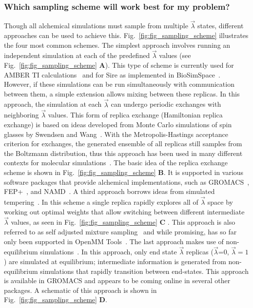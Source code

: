 \documentclass[9pt,bestpractices]{livecoms}
\begin{document}
\subsubsection{Which sampling scheme will work best for my problem?}
\label{sec:sampling_schemes}
Though all alchemical simulations must sample from multiple $\vec{\lambda}$ states, different approaches can be used to achieve this. Fig.~\ref{fig:fig_sampling_scheme} illustrates the four most common schemes. The simplest approach involves running an independent simulation at each of the predefined $\vec{\lambda}$ values (see Fig.~\ref{fig:fig_sampling_scheme} \textbf{A}). This type of scheme is currently used for AMBER TI calculations~\cite{song2019using} and for Sire as implemented in BioSimSpace~\cite{hedges2019biosimspace}. However, if these simulations can be run simultaneously with communication between them, a simple extension allows mixing between these replicas. In this approach, the simulation at each $\vec{\lambda}$ can undergo periodic exchanges with neighboring $\vec{\lambda}$ values. This form of replica exchange (Hamiltonian replica exchange) is based on ideas developed from Monte Carlo simulations of spin glasses by Swendsen and Wang~\cite{swendsen1986replica}. With the Metropolis-Hastings acceptance criterion for exchanges, the generated ensemble of all replicas still samples from the Boltzmann distribution, thus this approach has been used in many different contexts for molecular simulations~\cite{sugita2000multidimensionala,sugita1999replicaexchangea, woods2003developmenta, jiang2010free}. The basic idea of the replica exchange scheme is shown in Fig.~\ref{fig:fig_sampling_scheme} \textbf{B}. It is supported in various software packages that provide alchemical implementations, such as GROMACS~\cite{aldeghi2015accurate}, FEP+~\cite{wang2015accurate}, and NAMD~\cite{jiang2019computing}. A third approach borrows ideas from simulated tempering~\cite{marinari1992simulateda}. In this scheme a single replica rapidly explores all of $\vec{\lambda}$ space by working out optimal weights that allow switching between different intermediate $\vec{\lambda}$ values, as seen in Fig.~\ref{fig:fig_sampling_scheme} \textbf{C} . This approach is also referred to as self adjusted mixture sampling~\cite{lyubartsev1992newa, li2007simulated, tan2017optimally} and while promising, has so far only been supported in OpenMM Tools~\cite{andrearizzi2019choderalab}. The last approach makes use of non-equilibrium simulations~\cite{aldeghi2018accurate}. In this approach, only end state $\vec{\lambda}$ replicas ($\vec{\lambda}$=0, $\vec{\lambda}=1$) are simulated at equilibrium; intermediate information is generated from non-equilibrium simulations that rapidly transition between end-states. This approach is available in GROMACS and appears to be coming online in several other packages. A schematic of this approach is shown in Fig.~\ref{fig:fig_sampling_scheme} \textbf{D}. 
\end{document}

